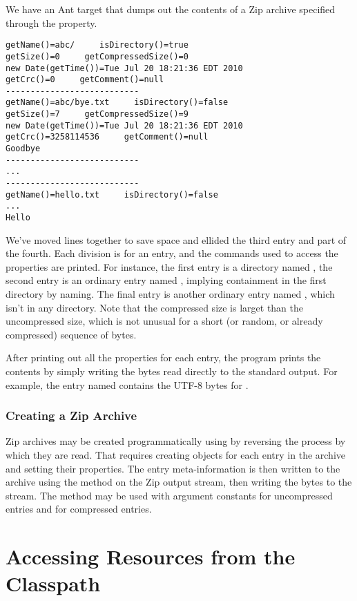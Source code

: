 We have an Ant target  that dumps out
the contents of a Zip archive specified through the
 property.
%
\begin{verbatim}
getName()=abc/     isDirectory()=true
getSize()=0     getCompressedSize()=0
new Date(getTime())=Tue Jul 20 18:21:36 EDT 2010
getCrc()=0     getComment()=null
---------------------------
getName()=abc/bye.txt     isDirectory()=false
getSize()=7     getCompressedSize()=9
new Date(getTime())=Tue Jul 20 18:21:36 EDT 2010
getCrc()=3258114536     getComment()=null
Goodbye
---------------------------
...
---------------------------
getName()=hello.txt     isDirectory()=false     
...
Hello
\end{verbatim}
%
We've moved lines together to save space and ellided the third entry
and part of the fourth.  Each division is for an entry, and the
commands used to access the properties are printed.  For instance, the
first entry is a directory named , the second entry is an
ordinary entry named , implying containment in the
first directory by naming.  The final entry is another ordinary entry
named , which isn't in any directory.  Note that the
compressed size is larget than the uncompressed size, which is not
unusual for a short (or random, or already compressed) sequence of
bytes.

After printing out all the properties for each entry, the program
prints the contents by simply writing the bytes read directly to the
standard output.  For example, the entry named 
contains the UTF-8 bytes for .


\subsubsection{Creating a Zip Archive}

Zip archives may be created programmatically using
 by reversing the process by which they are
read.  That requires creating  objects for each entry
in the archive and setting their properties.  The entry
meta-information is then written to the archive using the
 method on the Zip output stream, then writing
the bytes to the stream.  The method  may be used
with argument constants  for uncompressed entries
and  for compressed entries.


\section{Accessing Resources from the Classpath}

